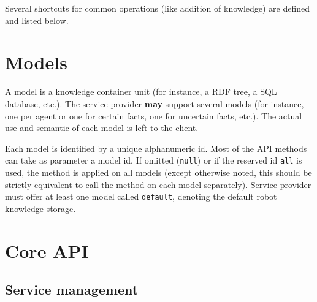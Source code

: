 
Several shortcuts for common operations (like addition of knowledge) are
defined and listed below.

\section{Models}
\label{sect|kbapi-models}

A model is a knowledge container unit (for instance, a RDF tree, a SQL
database, etc.). The service provider \textbf{may} support several models
(for instance, one per agent or one for certain facts, one for uncertain facts,
etc.). The actual use and semantic of each model is left to the client.

Each model is identified by a unique alphanumeric id. Most of
the API methods can take as parameter a model id. If omitted ({\tt null}) or
if the reserved id {\tt all} is used, the method is applied on all models
(except otherwise noted, this should be strictly equivalent to call the method
on each model separately). Service provider must offer at least one model
called {\tt default}, denoting the default robot knowledge storage.


\section{Core API}

\subsection{Service management}


